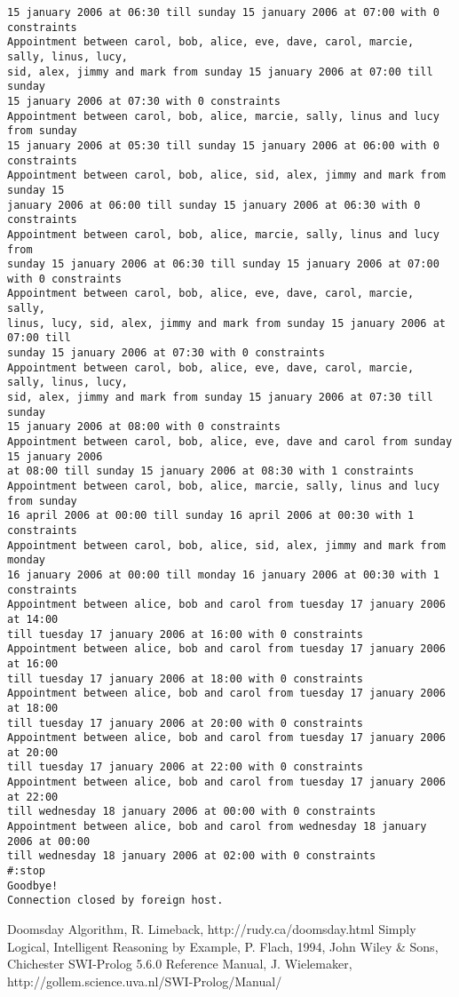 \documentclass[a4paper]{article}
\begin{document}
\begin{verbatim}
15 january 2006 at 06:30 till sunday 15 january 2006 at 07:00 with 0 constraints 
Appointment between carol, bob, alice, eve, dave, carol, marcie, sally, linus, lucy, 
sid, alex, jimmy and mark from sunday 15 january 2006 at 07:00 till sunday 
15 january 2006 at 07:30 with 0 constraints 
Appointment between carol, bob, alice, marcie, sally, linus and lucy from sunday 
15 january 2006 at 05:30 till sunday 15 january 2006 at 06:00 with 0 constraints 
Appointment between carol, bob, alice, sid, alex, jimmy and mark from sunday 15 
january 2006 at 06:00 till sunday 15 january 2006 at 06:30 with 0 constraints 
Appointment between carol, bob, alice, marcie, sally, linus and lucy from 
sunday 15 january 2006 at 06:30 till sunday 15 january 2006 at 07:00 with 0 constraints 
Appointment between carol, bob, alice, eve, dave, carol, marcie, sally, 
linus, lucy, sid, alex, jimmy and mark from sunday 15 january 2006 at 07:00 till 
sunday 15 january 2006 at 07:30 with 0 constraints 
Appointment between carol, bob, alice, eve, dave, carol, marcie, sally, linus, lucy, 
sid, alex, jimmy and mark from sunday 15 january 2006 at 07:30 till sunday 
15 january 2006 at 08:00 with 0 constraints 
Appointment between carol, bob, alice, eve, dave and carol from sunday 15 january 2006 
at 08:00 till sunday 15 january 2006 at 08:30 with 1 constraints 
Appointment between carol, bob, alice, marcie, sally, linus and lucy from sunday 
16 april 2006 at 00:00 till sunday 16 april 2006 at 00:30 with 1 constraints 
Appointment between carol, bob, alice, sid, alex, jimmy and mark from monday 
16 january 2006 at 00:00 till monday 16 january 2006 at 00:30 with 1 constraints 
Appointment between alice, bob and carol from tuesday 17 january 2006 at 14:00 
till tuesday 17 january 2006 at 16:00 with 0 constraints 
Appointment between alice, bob and carol from tuesday 17 january 2006 at 16:00 
till tuesday 17 january 2006 at 18:00 with 0 constraints 
Appointment between alice, bob and carol from tuesday 17 january 2006 at 18:00 
till tuesday 17 january 2006 at 20:00 with 0 constraints 
Appointment between alice, bob and carol from tuesday 17 january 2006 at 20:00 
till tuesday 17 january 2006 at 22:00 with 0 constraints 
Appointment between alice, bob and carol from tuesday 17 january 2006 at 22:00 
till wednesday 18 january 2006 at 00:00 with 0 constraints 
Appointment between alice, bob and carol from wednesday 18 january 2006 at 00:00 
till wednesday 18 january 2006 at 02:00 with 0 constraints 
#:stop      
Goodbye!
Connection closed by foreign host.

\end{verbatim}



\begin{thebibliography}{99}
 Doomsday Algorithm, R. Limeback, http://rudy.ca/doomsday.html
 Simply Logical, Intelligent Reasoning by Example, P. Flach, 1994, John Wiley \& Sons, Chichester
 SWI-Prolog 5.6.0 Reference Manual, J. Wielemaker, http://gollem.science.uva.nl/SWI-Prolog/Manual/
\end{thebibliography}
\end{document}

